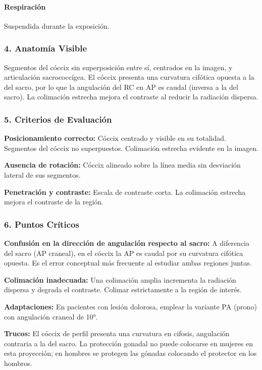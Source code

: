 	\paragraph{Respiración}
	Suspendida durante la exposición.
	
	\subsubsection*{4. Anatomía Visible}
	
	Segmentos del cóccix sin superposición entre sí, centrados en la imagen, y articulación sacrococcígea. El cóccix presenta una curvatura cifótica opuesta a la del sacro, por lo que la angulación del RC en AP es caudal (inversa a la del sacro). La colimación estrecha mejora el contraste al reducir la radiación dispersa.
	
	\subsubsection*{5. Criterios de Evaluación}
	
	\textbf{Posicionamiento correcto:} Cóccix centrado y visible en su totalidad. Segmentos del cóccix no superpuestos. Colimación estrecha evidente en la imagen.
	
	\textbf{Ausencia de rotación:} Cóccix alineado sobre la línea media sin desviación lateral de sus segmentos.
	
	\textbf{Penetración y contraste:} Escala de contraste corta. La colimación estrecha mejora el contraste de la región.
	
	\subsubsection*{6. Puntos Críticos}
	
	\textbf{Confusión en la dirección de angulación respecto al sacro:} A diferencia del sacro (AP craneal), en el cóccix la AP es caudal por su curvatura cifótica opuesta. Es el error conceptual más frecuente al estudiar ambas regiones juntas.
	
	\textbf{Colimación inadecuada:} Una colimación amplia incrementa la radiación dispersa y degrada el contraste. Colimar estrictamente a la región de interés.
	
	\textbf{Adaptaciones:} En pacientes con lesión dolorosa, emplear la variante PA (prono) con angulación craneal de 10°.
	
	\textbf{Trucos:} El cóccix de perfil presenta una curvatura en cifosis, angulación contraria a la del sacro. La protección gonadal no puede colocarse en mujeres en esta proyección; en hombres se protegen las gónadas colocando el protector en los hombros.
	
